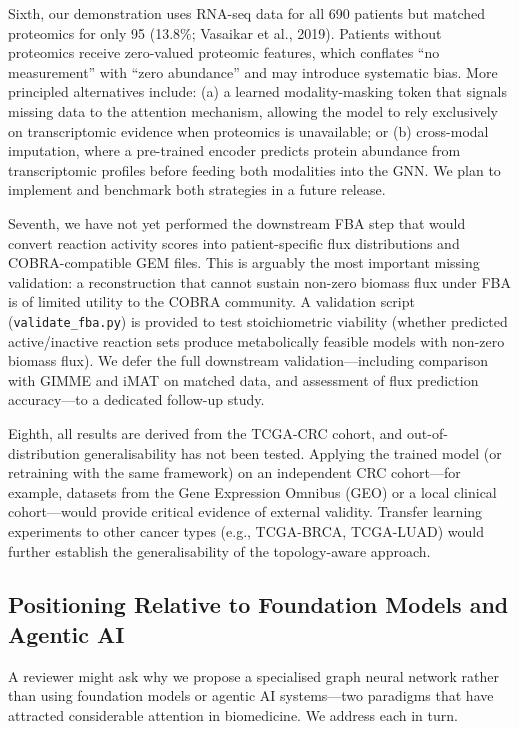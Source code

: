 \documentclass[12pt,a4paper]{article}
\begin{document}
Sixth, our demonstration uses RNA-seq data for all 690 patients but matched proteomics for only 95 (13.8\%; Vasaikar et al., 2019). Patients without proteomics receive zero-valued proteomic features, which conflates ``no measurement'' with ``zero abundance'' and may introduce systematic bias. More principled alternatives include: (a) a learned modality-masking token that signals missing data to the attention mechanism, allowing the model to rely exclusively on transcriptomic evidence when proteomics is unavailable; or (b) cross-modal imputation, where a pre-trained encoder predicts protein abundance from transcriptomic profiles before feeding both modalities into the GNN. We plan to implement and benchmark both strategies in a future release.

Seventh, we have not yet performed the downstream FBA step that would convert reaction activity scores into patient-specific flux distributions and COBRA-compatible GEM files. This is arguably the most important missing validation: a reconstruction that cannot sustain non-zero biomass flux under FBA is of limited utility to the COBRA community. A validation script (\texttt{validate\_fba.py}) is provided to test stoichiometric viability (whether predicted active/inactive reaction sets produce metabolically feasible models with non-zero biomass flux). We defer the full downstream validation---including comparison with GIMME and iMAT on matched data, and assessment of flux prediction accuracy---to a dedicated follow-up study.

Eighth, all results are derived from the TCGA-CRC cohort, and out-of-distribution generalisability has not been tested. Applying the trained model (or retraining with the same framework) on an independent CRC cohort---for example, datasets from the Gene Expression Omnibus (GEO) or a local clinical cohort---would provide critical evidence of external validity. Transfer learning experiments to other cancer types (e.g., TCGA-BRCA, TCGA-LUAD) would further establish the generalisability of the topology-aware approach.

\subsection{Positioning Relative to Foundation Models and Agentic AI}

A reviewer might ask why we propose a specialised graph neural network rather than using foundation models or agentic AI systems---two paradigms that have attracted considerable attention in biomedicine. We address each in turn.
\end{document}

